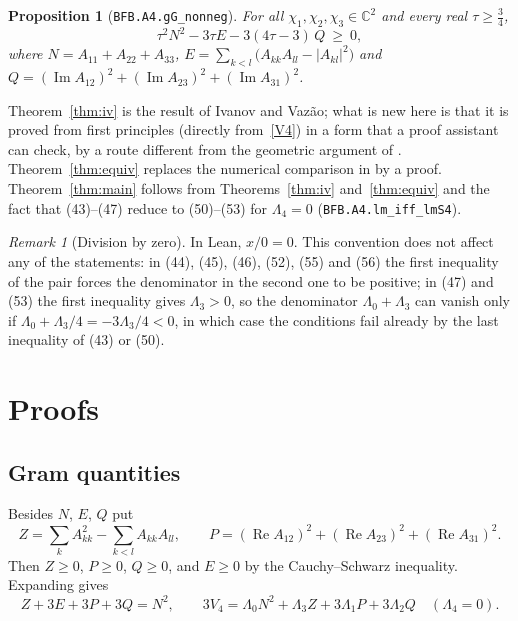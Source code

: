 \documentclass[11pt,a4paper]{amsart}
\newtheorem{proposition}[theorem]{Proposition}
\theoremstyle{remark}
\newtheorem{remark}[theorem]{Remark}
\newcommand{\C}{\mathbb{C}}
\newcommand{\La}{\Lambda}
\newcommand{\lean}[1]{\texttt{#1}}
\renewcommand{\Re}{\operatorname{Re}}
\renewcommand{\Im}{\operatorname{Im}}
\begin{document}
\begin{proposition}[\lean{BFB.A4.gG\_nonneg}]\label{prop:key}
For all $\chi_1,\chi_2,\chi_3\in\C^2$ and every real $\tau\ge\frac34$,
\begin{equation}\label{key}
\tau^2N^2-3\tau E-3(4\tau-3)\,Q\ \ge\ 0,
\end{equation}
where $N=A_{11}+A_{22}+A_{33}$, $E=\sum_{k<l}\bigl(A_{kk}A_{ll}-|A_{kl}|^2\bigr)$ and
$Q=(\Im A_{12})^2+(\Im A_{23})^2+(\Im A_{31})^2$.
\end{proposition}

Theorem~\ref{thm:iv} is the result of Ivanov and Vaz\~ao; what is new here is that it is proved from first
principles (directly from~\eqref{V4}) in a form that a proof assistant can check, by a route different from
the geometric argument of \cite{IV}. Theorem~\ref{thm:equiv} replaces the numerical comparison in \cite{LM} by
a proof. Theorem~\ref{thm:main} follows from Theorems~\ref{thm:iv} and~\ref{thm:equiv} and the fact that
(43)--(47) reduce to (50)--(53) for $\La_4=0$ (\lean{BFB.A4.lm\_iff\_lmS4}).

\begin{remark}[Division by zero]
In Lean, $x/0=0$. This convention does not affect any of the statements: in (44), (45), (46), (52), (55) and
(56) the first inequality of the pair forces the denominator in the second one to be positive; in (47) and (53)
the first inequality gives $\La_3>0$, so the denominator $\La_0+\La_3$ can vanish only if
$\La_0+\La_3/4=-3\La_3/4<0$, in which case the conditions fail already by the last inequality of (43) or (50).
\end{remark}

\section{Proofs}

\subsection{Gram quantities}
Besides $N$, $E$, $Q$ put
\[
Z=\sum_kA_{kk}^2-\sum_{k<l}A_{kk}A_{ll},\qquad P=(\Re A_{12})^2+(\Re A_{23})^2+(\Re A_{31})^2 .
\]
Then $Z\ge0$, $P\ge0$, $Q\ge0$, and $E\ge0$ by the Cauchy--Schwarz inequality. Expanding gives
\begin{equation}\label{rel}
Z+3E+3P+3Q=N^2,\qquad 3V_4=\La_0N^2+\La_3Z+3\La_1P+3\La_2Q\quad(\La_4=0).
\end{equation}
\end{document}
